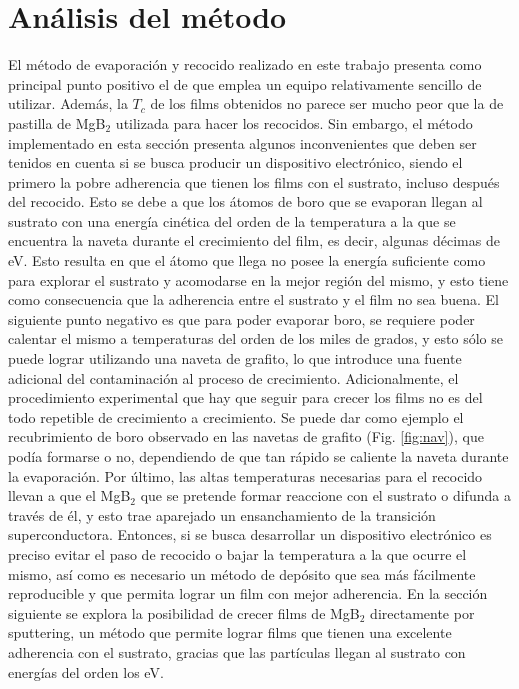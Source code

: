 \section{Análisis del método}\label{S:evapanalisis}
El método de evaporación y recocido realizado en este trabajo presenta como principal punto positivo el de que emplea un equipo relativamente sencillo de utilizar. Además, la $T_{c}$ de los films obtenidos no parece ser mucho peor que la de pastilla de MgB$_{2}$ utilizada para hacer los recocidos. Sin embargo, el método implementado en esta sección presenta algunos inconvenientes que deben ser tenidos en cuenta si se busca producir un dispositivo electrónico, siendo el primero la pobre adherencia que tienen los films con el sustrato, incluso después del recocido. Esto se debe a que los átomos de boro que se evaporan llegan al sustrato con una energía cinética del orden de la temperatura a la que se encuentra la naveta durante el crecimiento del film, es decir, algunas décimas de eV. Esto resulta en que el átomo que llega no posee la energía suficiente como para explorar el sustrato y acomodarse en la mejor región del mismo, y esto tiene como consecuencia que la adherencia entre el sustrato y el film no sea buena. El siguiente punto negativo es que para poder evaporar boro, se requiere poder calentar el mismo a temperaturas del orden de los miles de grados, y esto sólo se puede lograr utilizando una naveta de grafito, lo que introduce una fuente adicional del contaminación al proceso de crecimiento. Adicionalmente, el procedimiento experimental que hay que seguir para crecer los films no es del todo repetible de crecimiento a crecimiento. Se puede dar como ejemplo el recubrimiento de boro observado en las navetas de grafito (Fig. \ref{fig:nav}), que podía formarse o no, dependiendo de que tan rápido se caliente la naveta durante la evaporación. Por último, las altas temperaturas necesarias para el recocido llevan a que el MgB$_{2}$ que se pretende formar reaccione con el sustrato o difunda a través de él, y esto trae aparejado un ensanchamiento de la transición superconductora. Entonces, si se busca desarrollar un dispositivo electrónico es preciso evitar el paso de recocido o bajar la temperatura a la que ocurre el mismo, así como es necesario un método de depósito que sea más fácilmente reproducible y que permita lograr un film con mejor adherencia. En la sección siguiente se explora la posibilidad de crecer films de MgB$_{2}$ directamente por sputtering, un método que permite lograr films que tienen una excelente adherencia con el sustrato, gracias que las partículas llegan al sustrato con energías del orden los eV. 
